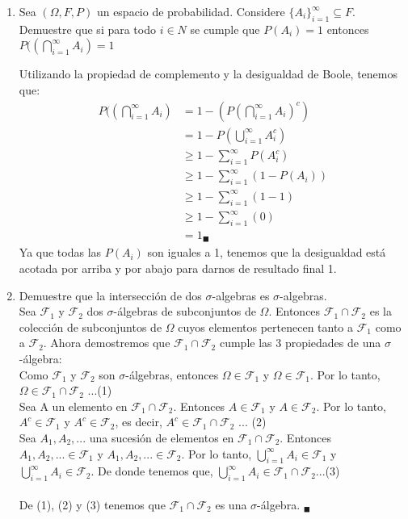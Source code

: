 \documentclass[12pt,a4paper]{report}
\begin{document}
\begin{enumerate}
  \item{
 Sea $(\Omega, F, P)$ un espacio de probabilidad. Considere $\lbrace A_{i} \rbrace_{i=1}^{\infty} \subseteq F$. Demuestre que si para todo $i \in N$ se cumple que $P(A_{i})=1$ entonces $P((\bigcap\limits_{i=1}^{\infty}A_{i})=1$

Utilizando la propiedad de complemento y la desigualdad de Boole, tenemos que:
\begin{align*}
P((\bigcap\limits_{i=1}^{\infty}A_{i}) &= 1 - (P(\bigcap\limits_{i=1}^{\infty}A_{i})^c) \\
&= 1- P(\bigcup\limits_{i=1}^{\infty}A^c_{i}) \\
&\geqslant 1- \sum_{i=1}^{\infty} P(A^c_{i}) \\
&\geqslant 1- \sum_{i=1}^{\infty} (1- P(A_{i})) \\
&\geqslant 1- \sum_{i=1}^{\infty} (1- 1) \\
&\geqslant 1- \sum_{i=1}^{\infty} (0) \\
&= 1 _{\blacksquare}
\end{align*}
Ya que todas las $P(A_{i})$ son iguales a 1, tenemos que la desigualdad está acotada por arriba y por abajo para darnos de resultado final 1.



  }

  \item{
 Demuestre que la intersección de dos $\sigma$-algebras es $\sigma$-algebras.\\

Sea $\mathcal{F}_{1}$ y $\mathcal{F}_{2}$ dos $\sigma$-álgebras de subconjuntos de $\Omega$.
Entonces $\mathcal{F}_{1} \cap \mathcal{F}_{2}$ es la colección de subconjuntos de $\Omega$ cuyos elementos pertenecen tanto a $\mathcal{F}_{1}$ como a $\mathcal{F}_{2}$.
Ahora demostremos que $\mathcal{F}_{1} \cap \mathcal{F}_{2}$ cumple las 3 propiedades de una $\sigma$-álgebra:\\
 	Como  $\mathcal{F}_{1}$ y $\mathcal{F}_{2}$ son $\sigma$-álgebras, entonces $\Omega 	\in \mathcal{F}_{1}$ y $\Omega \in \mathcal{F}_{1}$. Por lo tanto, $\Omega \in\mathcal{F}_{1} \cap \mathcal{F}_{2}$ ...(1)\\
 	Sea A un elemento en $\mathcal{F}_{1} \cap \mathcal{F}_{2}$. Entonces $A \in \mathcal{F}_{1}$ y $A \in \mathcal{F}_{2}$. Por lo tanto, $A^c \in \mathcal{F}_{1}$ y $A^c \in \mathcal{F}_{2}$, es decir, $A^c \in\mathcal{F}_{1} \cap \mathcal{F}_{2}$ ... (2)\\
 	Sea $A_{1},A_{2},...$ una sucesión de elementos en $\mathcal{F}_{1} \cap \mathcal{F}_{2}$. Entonces $A_{1},A_{2},... \in \mathcal{F}_{1}$ y $A_{1},A_{2},... \in \mathcal{F}_{2}$. Por lo tanto, $\bigcup\limits_{i=1}^{\infty}A_{i}  \in \mathcal{F}_{1}$ y  $\bigcup\limits_{i=1}^{\infty}A_{i}  \in \mathcal{F}_{2}$. De donde tenemos que, $\bigcup\limits_{i=1}^{\infty}A_{i}  \in \mathcal{F}_{1} \cap \mathcal{F}_{2}$...(3)\\
 	\\De (1), (2) y (3) tenemos que $\mathcal{F}_{1} \cap \mathcal{F}_{2}$ es una  $\sigma$-álgebra. $_{\blacksquare}$\\

}
\end{enumerate}
\end{document}
